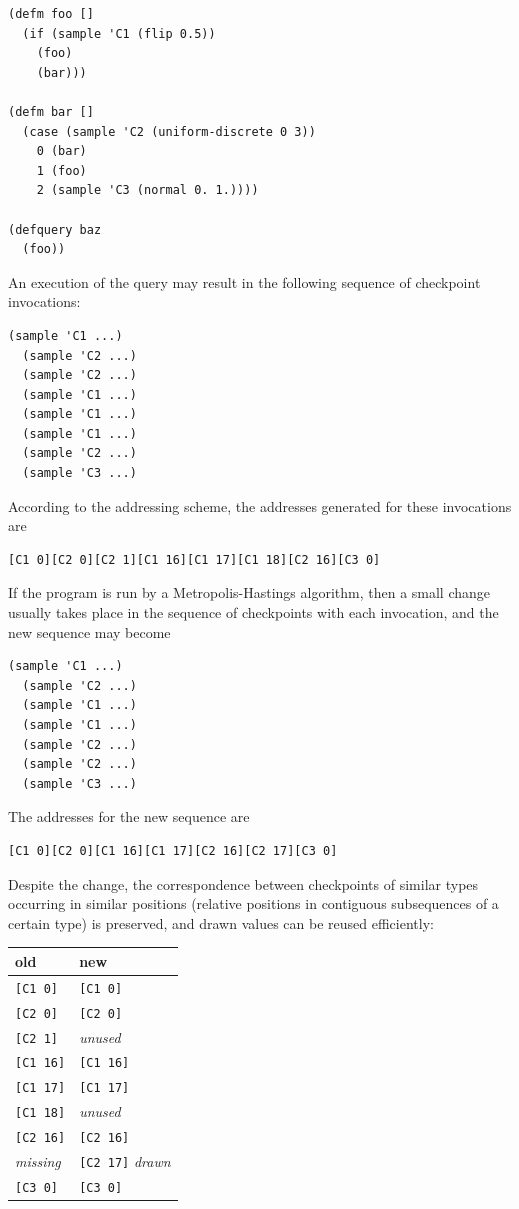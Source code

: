\documentclass[preprint]{sigplanconf}
\begin{document}
\begin{lstlisting}[style=default]
(defm foo []
  (if (sample 'C1 (flip 0.5))
    (foo)
    (bar)))

(defm bar []
  (case (sample 'C2 (uniform-discrete 0 3))
    0 (bar)
    1 (foo)
    2 (sample 'C3 (normal 0. 1.))))

(defquery baz
  (foo))
\end{lstlisting}
An execution of the query may result in the following
sequence of checkpoint invocations:
\begin{lstlisting}[style=default]
  (sample 'C1 ...)
  (sample 'C2 ...)
  (sample 'C2 ...)
  (sample 'C1 ...)
  (sample 'C1 ...)
  (sample 'C1 ...)
  (sample 'C2 ...)
  (sample 'C3 ...)
\end{lstlisting}
According to the addressing scheme, the addresses generated
for these invocations are
\begin{lstlisting}[style=default]
[C1 0][C2 0][C2 1][C1 16][C1 17][C1 18][C2 16][C3 0]
\end{lstlisting}
If the program is run by a Metropolis-Hastings algorithm, then a
small change usually takes place in the sequence of checkpoints
with each invocation, and the new sequence may become
\begin{lstlisting}[style=default]
  (sample 'C1 ...)
  (sample 'C2 ...)
  (sample 'C1 ...)
  (sample 'C1 ...)
  (sample 'C2 ...)
  (sample 'C2 ...)
  (sample 'C3 ...)
\end{lstlisting}
The addresses for the new sequence are
\begin{lstlisting}[style=default]
  [C1 0][C2 0][C1 16][C1 17][C2 16][C2 17][C3 0]
\end{lstlisting}
Despite the change, the correspondence between checkpoints of
similar types occurring in similar positions (relative positions
in contiguous subsequences of a certain type) is preserved, and
drawn values can be reused efficiently:

\vspace{\baselineskip}
{
\begin{tabular}{l l}
    \textbf{old} & \textbf{new} \\ \hline
    {}\texttt{[C1 0]} & \texttt{[C1 0]} \\
    {}\texttt{[C2 0]} & \texttt{[C2 0]} \\
    {}\texttt{[C2 1]} & \textit{unused} \\
    {}\texttt{[C1 16]} & \texttt{[C1 16]} \\
    {}\texttt{[C1 17]} & \texttt{[C1 17]} \\
    {}\texttt{[C1 18]} & \textit{unused} \\
    {}\texttt{[C2 16]} & \texttt{[C2 16]} \\
    \textit{missing} & \texttt{[C2 17]} \textit{drawn}\\
    {}\texttt{[C3 0]} & \texttt{[C3 0]}
\end{tabular}
\vspace{\baselineskip}}
\end{document}
